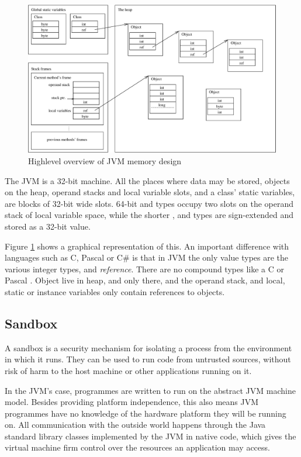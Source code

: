 \begin{figure}
\centering
\includegraphics[width=\linewidth]{jvmmemory.eps}
\caption{Highlevel overview of JVM memory design}
\label{fig-jvm-memory}
\end{figure}

The JVM is a 32-bit machine. All the places where data may be stored, objects on the heap, operand stacks and local variable slots, and a class' static variables, are blocks of 32-bit wide slots. 64-bit  and  types occupy two slots on the operand stack of local variable space, while the shorter , and  types are sign-extended and stored as a 32-bit value.
  
Figure \ref{fig-jvm-memory} shows a graphical representation of this. An important difference with languages such as C, Pascal or C\# is that in JVM the only value types are the various integer types, and \emph{reference}. There are no compound types like a C  or Pascal . Object live in heap, and only there, and the operand stack, and local, static or instance variables only contain references to objects.

\subsection{Sandbox}
A sandbox is a security mechanism for isolating a process from the environment in which it runs. They can be used to run code from untrusted sources, without risk of harm to the host machine or other applications running on it.

In the JVM's case, programmes are written to run on the abstract JVM machine model. Besides providing platform independence, this also means JVM programmes have no knowledge of the hardware platform they will be running on. All communication with the outside world happens through the Java standard library classes implemented by the JVM in native code, which gives the virtual machine firm control over the resources an application may access.

